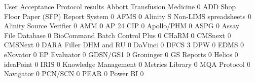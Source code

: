 \documentclass{article}
\begin{document}
\begin{Schunk}
\begin{Soutput}
                                           User Acceptance Protocol results
  Abbott Transfusion Medicine                                             0
  ADD Shop Floor Paper (SFP) Report System                                0
  AFMS                                                                    0
  Alinity S Non-LIMS spreadsheets                                         0
  Alinity Source Verifier                                                 0
  AMM                                                                     0
  AP 24 CIP                                                               0
  Apollo/PHM                                                              0
  ASPG                                                                    0
  Assay File Database                                                     0
  BioCommand Batch Control Plus                                           0
  CHaRM                                                                   0
  CMSnext                                                                 0
  CMSNext                                                                 0
  DARA Filler DHM and RU                                                  0
  DaVinci                                                                 0
  DFCS                                                                    3
  DPW                                                                     0
  EDMS                                                                    0
  eNovator                                                                0
  EP Evaluator                                                            0
  GDSN/GS1                                                                0
  Groninger                                                               0
  GS Reports                                                              0
  Helios                                                                  0
  ideaPoint                                                               0
  IRIS                                                                    0
  Knowledge Management                                                    0
  Metrics Library                                                         0
  MQA Protocol                                                            0
  Navigator                                                               0
  PCN/SCN                                                                 0
  PEAR                                                                    0
  Power BI                                                                0

\end{Soutput}
\end{Schunk}
\end{document}
